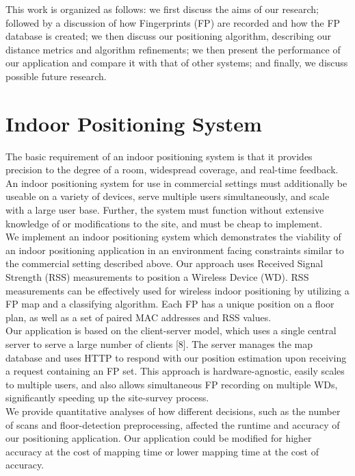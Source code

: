 \documentclass[conference]{IEEEtran}
\begin{document}
\indent This work is organized as follows: we first discuss the aims of our research; followed by a discussion of how Fingerprints (FP) are recorded and how the FP database is created; we then discuss our positioning algorithm, describing our distance metrics and algorithm refinements; we then present the performance of our application and compare it with that of other systems; and finally, we discuss possible future research.

\section{Indoor Positioning System}
The basic requirement of an indoor positioning system is that it provides precision to the degree of a room, widespread coverage, and real-time feedback. An indoor positioning system for use in commercial settings must additionally be useable on a variety of devices, serve multiple users simultaneously, and scale with a large user base. Further, the system must function without extensive knowledge of or modifications to the site, and must be cheap to implement. \\
\indent We implement an indoor positioning system which demonstrates the viability of an indoor positioning application in an environment facing constraints similar to the commercial setting described above. 
\indent Our approach uses Received Signal Strength (RSS) measurements to position a Wireless Device (WD). RSS measurements can be effectively used for wireless indoor positioning by utilizing a FP map and a classifying algorithm. Each FP has a unique position on a floor plan, as well as a set of paired MAC addresses and RSS values.\\
\indent Our application is based on the client-server model, which uses a single central server to serve a large number of clients [8]. The server manages the map database and uses HTTP to respond with our position estimation upon receiving a request containing an FP set. This approach is hardware-agnostic, easily scales to multiple users, and also allows simultaneous FP recording on multiple WDs, significantly speeding up the site-survey process.\\ 
\indent We provide quantitative analyses of how different decisions, such as the number of scans and floor-detection preprocessing, affected the runtime and accuracy of our positioning application. Our application could be modified for higher accuracy at the cost of mapping time or lower mapping time at the cost of accuracy. 
\end{document}
